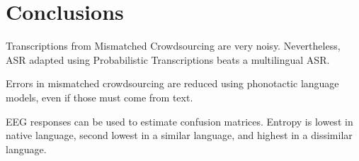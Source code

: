 
\section{Conclusions}

Transcriptions from Mismatched Crowdsourcing are very noisy.
Nevertheless, ASR adapted using Probabilistic Transcriptions beats a
multilingual ASR.

Errors in mismatched crowdsourcing are reduced using phonotactic
language models, even if those must come from text.

EEG responses can be used to estimate confusion matrices. Entropy is
lowest in native language, second lowest in a similar language, and
highest in a dissimilar language.

